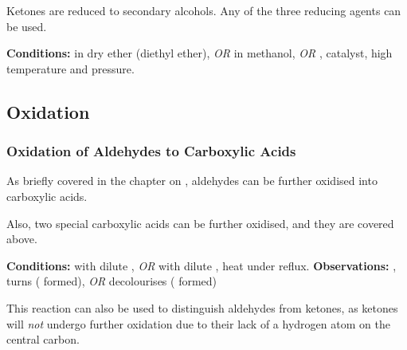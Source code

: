 				Ketones are reduced to secondary alcohols. Any of the three reducing agents can be used.

				\vspace{1.5em}
				\vbox{\textbf{Conditions:}	\tabto{35mm} in dry ether (diethyl ether), \textit{OR}
	  										\tabto{35mm}\ch{NaBH4} in methanol, \textit{OR}
	  										\tabto{35mm},  catalyst, high temperature and pressure.}




		\subsection{Oxidation}

			\subsubsection{Oxidation of Aldehydes to Carboxylic Acids}

				As briefly covered in the chapter on \hyperlink{CompleteOxidationOfPrimaryAlcohols}{}, aldehydes can be
				further oxidised into carboxylic acids.

				Also, two special carboxylic acids can be further oxidised, and they are covered above.

				\vspace{1.5em}
				\vbox{\textbf{Conditions:}	\tabto{35mm} with dilute , \textit{OR}  with dilute ,
											\tabto{35mm}heat under reflux.}
				\vspace{0.75em}
				\vbox{\textbf{Observations:}\tabto{35mm} , turns 
														( formed), \textit{OR}
											\tabto{35mm}  decolourises ( formed)}


				This reaction can also be used to distinguish aldehydes from ketones, as ketones will \textit{not} undergo further oxidation
				due to their lack of a hydrogen atom on the central carbon.


